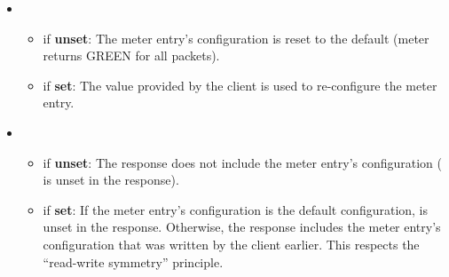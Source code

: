 \documentclass[11pt]{article}
\begin{document}
{\begin{itemize}
\begin{itemize}[noitemsep,topsep=\mdcompacttopsep]
\begin{itemize}[noitemsep,topsep=\mdcompacttopsep]%

\item{}if \textbf{unset}: The initial configuration for the meter entry is the
default (meter returns GREEN for all packets).%

\item{}if \textbf{set}: The initial configuration for the meter entry is the one
provided by the client.%
\end{itemize}%

\item{}

\begin{itemize}[noitemsep,topsep=\mdcompacttopsep]%

\item{}if \textbf{unset}: The meter entry's configuration is reset to the default
(meter returns GREEN for all packets).%

\item{}if \textbf{set}: The value provided by the client is used to re-configure
the meter entry.%
\end{itemize}%

\item{}

\begin{itemize}[noitemsep,topsep=\mdcompacttopsep]%

\item{}if \textbf{unset}: The response does not include the meter entry's
configuration ( is unset in the response).%

\item{}if \textbf{set}: If the meter entry's configuration is the default
configuration,  is unset in the response. Otherwise, the
response includes the meter entry's configuration that was written by
the client earlier. This respects the \textquotedblleft{}read-write symmetry\textquotedblright{} principle.%
\end{itemize}%
\end{itemize}%


\end{itemize}}
\end{document}

